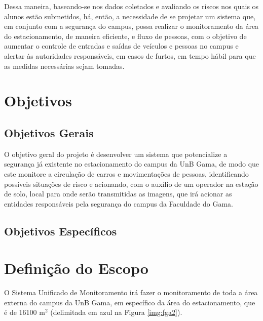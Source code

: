 Dessa maneira, baseando-se nos dados coletados e avaliando os riscos nos quais os alunos estão submetidos, há, então, a necessidade de se projetar  um sistema que, em conjunto com a segurança do campus, possa realizar o monitoramento  da área do estacionamento, de maneira eficiente, e fluxo de pessoas,  com o objetivo de aumentar o controle de entradas e saídas de veículos e pessoas no campus e alertar às autoridades responsáveis, em casos de furtos, em tempo hábil para que as medidas necessárias sejam tomadas.


\section{Objetivos} %
\label{sec:objetivos}

  \subsection{Objetivos Gerais} %
  \label{sub:objetivos_gerais}

  O objetivo geral do projeto é desenvolver um sistema que potencialize a segurança já existente no estacionamento do campus da UnB Gama, de modo que este monitore a circulação de carros e movimentações de pessoas, identificando possíveis situações de risco e acionando, com o auxílio de um operador na estação de solo, local para onde serão transmitidas as imagens, que irá acionar as entidades responsáveis pela segurança do campus da Faculdade do Gama.

  \subsection{Objetivos Específicos} %
  \label{sub:objetivos_espec_ficos}


\section{Definição do Escopo} %
\label{sec:defini_o_do_escopo}


  O Sistema Unificado de Monitoramento irá fazer o monitoramento de toda a área externa do campus da UnB Gama, em específico da área do estacionamento, que é de 16100 m$^2$ (delimitada em azul na Figura \ref{img:fga2}).

